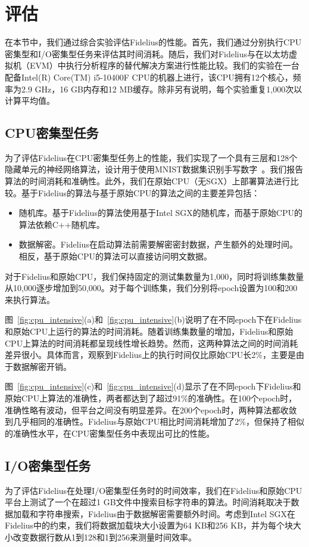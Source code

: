 \section{评估}\label{sec:eval}


在本节中，我们通过综合实验评估Fidelius的性能。首先，我们通过分别执行CPU密集型和I/O密集型任务来评估其时间消耗。随后，我们对Fidelius与在以太坊虚拟机（EVM）中执行分析程序的替代解决方案进行性能比较。我们的实验在一台配备Intel(R) Core(TM) i5-10400F CPU的机器上进行，该CPU拥有12个核心，频率为2.9 GHz，16 GB内存和12 MB缓存。除非另有说明，每个实验重复1,000次以计算平均值。

\subsection{CPU密集型任务}
为了评估Fidelius在CPU密集型任务上的性能，我们实现了一个具有三层和128个隐藏单元的神经网络算法，设计用于使用MNIST数据集识别手写数字~\cite{mnist}。我们报告算法的时间消耗和准确性。此外，我们在原始CPU（无SGX）上部署算法进行比较。基于Fidelius的算法与基于原始CPU的算法之间的主要差异包括：
\begin{itemize}
  \item 随机库。基于Fidelius的算法使用基于Intel SGX的随机库，而基于原始CPU的算法依赖C++随机库。
  \item 数据解密。Fidelius在启动算法前需要解密密封数据，产生额外的处理时间。相反，基于原始CPU的算法可以直接访问明文数据。
\end{itemize}
对于Fidelius和原始CPU，我们保持固定的测试集数量为1,000，同时将训练集数量从10,000逐步增加到50,000。对于每个训练集，我们分别将epoch设置为100和200来执行算法。



图~\ref{fig:cpu_intensive}(a)和~\ref{fig:cpu_intensive}(b)说明了在不同epoch下在Fidelius和原始CPU上运行的算法的时间消耗。随着训练集数量的增加，Fidelius和原始CPU上算法的时间消耗都呈现线性增长趋势。然而，这两种算法之间的时间消耗差异很小。具体而言，观察到Fidelius上的执行时间仅比原始CPU长2\%，主要是由于数据解密开销。

图~\ref{fig:cpu_intensive}(c)和~\ref{fig:cpu_intensive}(d)显示了在不同epoch下Fidelius和原始CPU上算法的准确性，两者都达到了超过91\%的准确性。在100个epoch时，准确性略有波动，但平台之间没有明显差异。在200个epoch时，两种算法都收敛到几乎相同的准确性。Fidelius与原始CPU相比时间消耗增加了2\%，但保持了相似的准确性水平，在CPU密集型任务中表现出可比的性能。

\subsection{I/O密集型任务}\label{subsec:io_intensive}
为了评估Fidelius在处理I/O密集型任务时的时间效率，我们在Fidelius和原始CPU平台上测试了一个在超过1 GB文件中搜索目标字符串的算法。时间消耗取决于数据加载和字符串搜索，Fidelius由于数据解密需要额外时间。考虑到Intel SGX在Fidelius中的约束，我们将数据加载块大小设置为64 KB和256 KB，并为每个块大小改变数据行数从1到128和1到256来测量时间效率。

